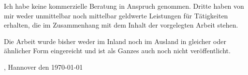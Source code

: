 Ich habe keine kommerzielle Beratung in Anspruch genommen. Dritte haben von mir weder unmittelbar noch mittelbar geldwerte Leistungen für Tätigkeiten erhalten, die im Zusammenhang mit dem Inhalt der vorgelegten Arbeit stehen.

Die Arbeit wurde bisher weder im Inland noch im Ausland in gleicher oder ähnlicher Form eingereicht und ist als Ganzes auch noch nicht veröffentlicht.

\vspace*{15mm}
\name, Hannover den \today

\clearpage
